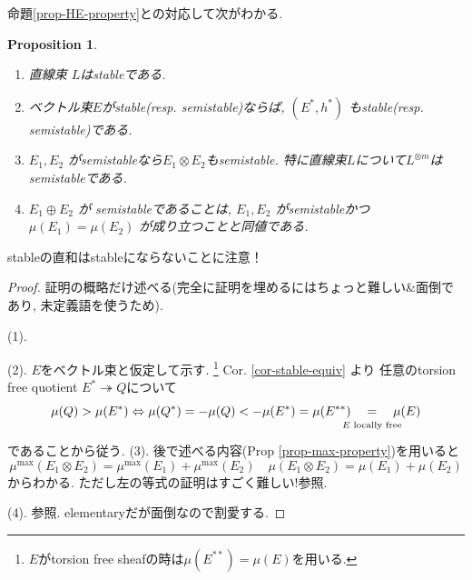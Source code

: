 \documentclass[dvipdfmx,a4paper,11pt]{article} %
\newtheorem{prop}[thm]{Proposition}
\theoremstyle{definition}
\theoremstyle{remark}
\numberwithin{equation}{section}
\newcommand{\underalign}[2]{\quad \underset{\mathclap{\strut #1}}{#2}\quad}
\begin{document}
命題\ref{prop-HE-property}との対応して次がわかる. 
\begin{prop}
\begin{enumerate}
\item[(1)]  直線束 $L$はstableである.
\item[(2)] ベクトル束$E$がstable(resp. semistable)ならば, $(E^*,h^*)$ もstable(resp. semistable)である.
\item[(3)] 
$E_1,E_2$ がsemistableなら$E_1\otimes E_2$もsemistable. 特に直線束$L$について$L^{\otimes m}$はsemistableである. 
\item[(4)] 
 $E_1\oplus E_2$ が semistableであることは, $E_1,E_2$ がsemistableかつ
 $\mu(E_1)=\mu(E_2)$ が成り立つことと同値である. 
\end{enumerate}
\end{prop}
stableの直和はstableにならないことに注意！
\begin{proof}
証明の概略だけ述べる(完全に証明を埋めるにはちょっと難しい\&面倒であり, 未定義語を使うため).

(1).

(2). $E$をベクトル束と仮定して示す. \footnote{$E$がtorsion free sheafの時は$\mu(E^{**})=\mu(E)$を用いる.}
Cor. \ref{cor-stable-equiv}
より
任意のtorsion free quotient $E^* \twoheadrightarrow Q$について
$$
\mu(Q) > \mu(E^{*})
\Leftrightarrow
\mu(Q^{*})=- \mu(Q) <-\mu(E^{*})=\mu(E^{**})
\underalign{\text{$E$ locally free}}{=}\mu(E)
$$
であることから従う. 
(3). 後で述べる内容(Prop \ref{prop-max-property})を用いると
$$
\mu^{\max}(E_1\otimes E_2)
=\mu^{\max}(E_1)+ \mu^{\max}(E_2)
\quad 
\mu(E_1\otimes E_2) = 
\mu(E_1) + \mu(E_2)  
$$
からわかる. ただし左の等式の証明はすごく難しい!\cite[2章]{Lazicnote}参照.
 
 (4). \cite[Proposition 5.7.9]{Kob14}参照. elementaryだが面倒なので割愛する.
\end{proof}
\end{document}
